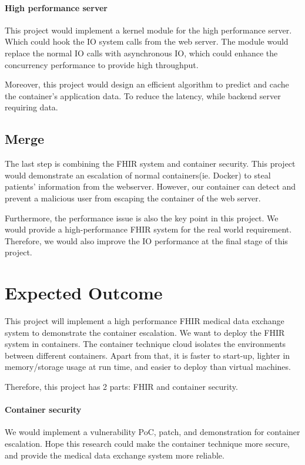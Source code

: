 \documentclass[12pt,a4paper]{IEEEconf}
\begin{document}
\paragraph{High performance server}
This project would implement a kernel module for the high performance server. Which could hook the IO
system calls from the web server. The module would replace the normal IO calls with asynchronous IO,
which could enhance the concurrency performance to provide high throughput.

Moreover, this project would design an efficient algorithm to predict and cache the container's
application data. To reduce the latency, while backend server requiring data.

\subsection{Merge}
The last step is combining the FHIR system and container security. This project would demonstrate
an escalation of normal containers(ie. Docker) to steal patients' information from the webserver.
However, our container can detect and prevent a malicious user from escaping the container of the
web server.

Furthermore, the performance issue is also the key point in this project. We would provide a
high-performance FHIR system for the real world requirement. Therefore, we would also improve the
IO performance at the final stage of this project.


\section{Expected Outcome}
This project will implement a high performance FHIR medical data exchange system to demonstrate
the container escalation. We want to deploy the FHIR system in containers. The container technique
cloud isolates the environments between different containers. Apart from that, it is faster to start-up,
lighter in memory/storage usage at run time, and easier to deploy than virtual machines.

Therefore, this project has 2 parts: FHIR and container security.
\paragraph{Container security}
We would implement a vulnerability PoC, patch, and demonstration for container escalation.
Hope this research could make the container technique more secure, and provide the medical
data exchange system more reliable.
\end{document}
